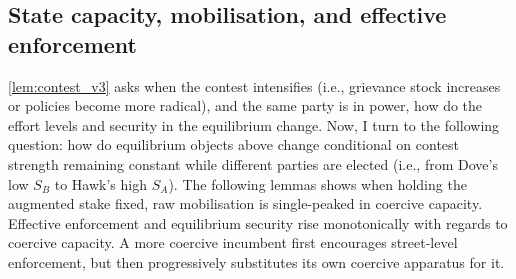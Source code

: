 \documentclass[11pt,twoside]{extarticle}
\begin{document}

\subsection{State capacity, mobilisation, and effective enforcement}\label{subsec:Sk_v3}

\autoref{lem:contest_v3} asks when the contest intensifies (i.e., grievance stock increases or policies become more radical), and the same party is in power, how do the effort levels and security in the equilibrium change. Now, I turn to the following question: how do equilibrium objects above change conditional on contest strength remaining constant while different parties are elected (i.e., from Dove's low $S_B$ to Hawk's high $S_A$). The following lemmas shows when holding the augmented stake fixed, raw mobilisation is single-peaked in coercive capacity. Effective enforcement and equilibrium security rise monotonically with regards to coercive capacity. A more coercive incumbent first encourages street-level enforcement, but then progressively substitutes its own coercive apparatus for it.

\end{document}
